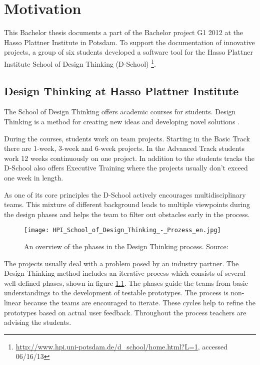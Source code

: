 \chapter{Motivation}

This Bachelor thesis documents a part of the Bachelor project G1 2012 at the Hasso Plattner Institute in Potsdam. To support the documentation of innovative projects, a group of six students developed a software tool for the Hasso Plattner Institute School of Design Thinking (D-School) \footnote{\url{http://www.hpi.uni-potsdam.de/d_school/home.html?L=1}, accessed 06/16/13}. 

\section{Design Thinking at Hasso Plattner Institute}
The School of Design Thinking offers academic courses for students. Design Thinking is a method for creating new ideas and developing novel solutions \cite{Plattner_2009}. 

During the courses, students work on team projects. Starting in the Basic Track there are 1-week, 3-week and 6-week projects. In the Advanced Track students work 12 weeks continuously on one project. In addition to the students tracks the D-School also offers Executive Training where the projects usually don't exceed one week in length. 

As one of its core principles the D-School actively encourages multidisciplinary teams. This mixture of different background leads to multiple viewpoints during the design phases and helps the team to filter out obstacles early in the process. 

\begin{figure}[!h]
\texttt{[image: HPI\_School\_of\_Design\_Thinking\_-\_Prozess\_en.jpg]}
\caption{An overview of the phases in the Design Thinking process. Source: \cite{Plattner_2009}}
\label{fig:DT_phases}
\end{figure}

The projects usually deal with a problem posed by an industry partner. The Design Thinking method includes an iterative process which consists of several well-defined phases, shown in figure \ref{fig:DT_phases}. The phases guide the teams from basic understandings to the development of testable prototypes. The process is non-linear because the teams are encouraged to iterate. These cycles help to refine the prototypes based on actual user feedback. Throughout the process teachers are advising the students.

